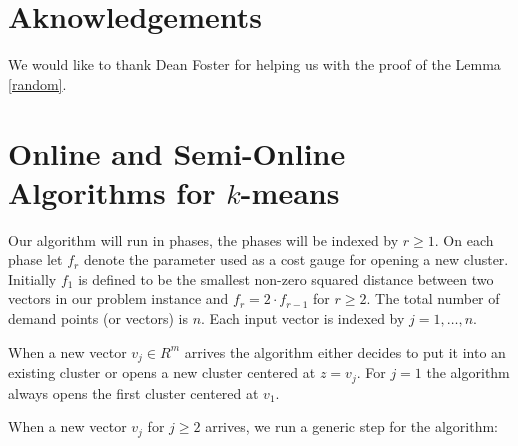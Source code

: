 \documentclass{article}
\begin{document}
\section{Aknowledgements}
We would like to thank  Dean Foster for  helping us with the proof of the Lemma \ref{random}.








\appendix




\section{Online and Semi-Online Algorithms for $k$-means}\label{alg}

Our algorithm will run in phases, the phases will be indexed by $r\ge 1$. On each phase  let $f_r$ denote the parameter used as a cost gauge for opening a new cluster. Initially $f_1$ is defined to be the smallest non-zero squared distance between two vectors in our problem instance and $f_r=2\cdot f_{r-1}$ for $r\ge 2$.
The total number of demand points (or vectors) is $n$.  Each input vector is indexed by  $j=1,\dots,n$. 

When a new vector $v_j\in R^m$ arrives the algorithm either decides to put it into an existing cluster or opens a new cluster centered at $z=v_j$. For $j=1$ the algorithm always opens the first cluster centered at $v_1$.

When a new vector $v_j$ for $j\ge 2$ arrives, we run a generic step for the algorithm:
\end{document}
